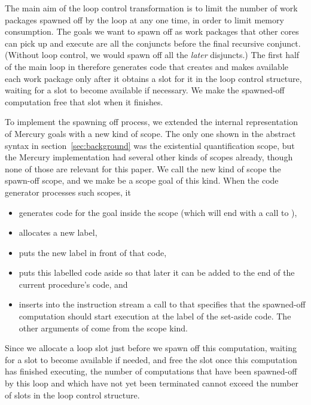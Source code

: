 
The main aim of the loop control transformation is
to limit the number of work packages spawned off by the loop at any one time,
in order to limit memory consumption.
The goals we want to spawn off
as work packages that other cores can pick up and execute
are all the conjuncts before the final recursive conjunct.
(Without loop control, we would spawn off all the \emph{later} disjuncts.)
The first half of the main loop in \createloopgoal
therefore generates code that creates and makes available each work package
only after it obtains a slot for it in the loop control structure,
waiting for a slot to become available if necessary.
We make the spawned-off computation free that slot when it finishes.

To implement the spawning off process,
we extended the internal representation of Mercury goals
with a new kind of scope.
The only one shown in the abstract syntax in section~\ref{sec:background}
was the existential quantification scope,
but the Mercury implementation had several other kinds of scopes already,
though none of those are relevant for this paper.
We call the new kind of scope the spawn-off scope,
and we make  be a scope goal of this kind.
When the code generator processes such scopes,
it
\begin{itemize}
\item
generates code for the goal inside the scope
(which will end with a call to ),
\item
allocates a new label,
\item
puts the new label in front of that code,
\item
puts this labelled code aside so that
later it can be added to the end of the current procedure's code, and
\item
inserts into the instruction stream a call to 
that specifies that the spawned-off computation should start execution
at the label of the set-aside code.
The other arguments of  come from the scope kind.
\end{itemize}

\noindent
Since we allocate a loop slot 
just before we spawn off this computation,
waiting for a slot to become available if needed,
and free the slot once this computation has finished executing,
the number of computations that have been spawned-off by this loop
and which have not yet been terminated
cannot exceed the number of slots in the loop control structure.

